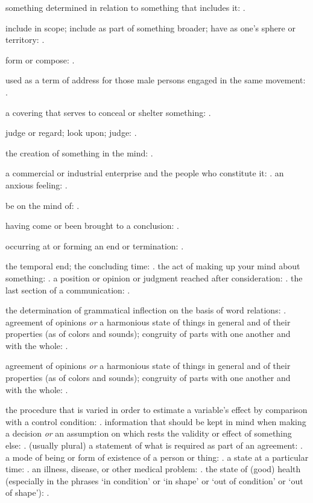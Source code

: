   something determined in relation to something that includes it: .

  include in scope; include as part of something broader; have as one's sphere or territory: .

  form or compose: .

  used as a term of address for those male persons engaged in the same movement: .

  a covering that serves to conceal or shelter something: .

  judge or regard; look upon; judge: .

  the creation of something in the mind: .

  a commercial or industrial enterprise and the people who constitute it: . an anxious feeling: .

  be on the mind of: .

  having come or been brought to a conclusion: .

  occurring at or forming an end or termination: .

  the temporal end; the concluding time: . the act of making up your mind about something: . a position or opinion or judgment reached after consideration: . the last section of a communication: .

  the determination of grammatical inflection on the basis of word relations: . agreement of opinions \textit{or} a harmonious state of things in general and of their properties (as of colors and sounds); congruity of parts with one another and with the whole: .

  agreement of opinions \textit{or} a harmonious state of things in general and of their properties (as of colors and sounds); congruity of parts with one another and with the whole: .

  the procedure that is varied in order to estimate a variable's effect by comparison with a control condition: . information that should be kept in mind when making a decision \textit{or} an assumption on which rests the validity or effect of something else: . (usually plural) a statement of what is required as part of an agreement: . a mode of being or form of existence of a person or thing: . a state at a particular time: . an illness, disease, or other medical problem: . the state of (good) health (especially in the phrases `in condition' or `in shape' or `out of condition' or `out of shape'): .

